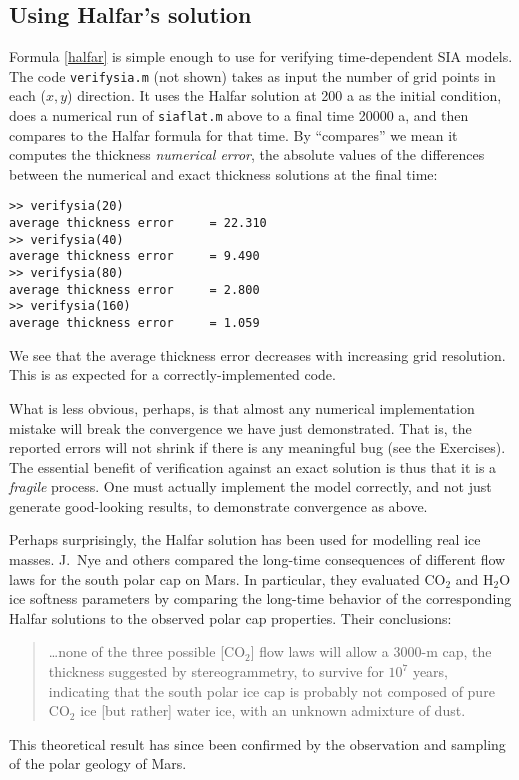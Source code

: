 \documentclass[letterpaper,final,12pt,reqno]{amsart}
\begin{document}
\subsection*{Using Halfar's solution}  Formula \eqref{halfar} is simple enough to use for verifying time-dependent SIA models.  The code \texttt{verifysia.m} (not shown) takes as input the number of grid points in each ($x,y$) direction.  It uses the Halfar solution at 200 a as the initial condition, does a numerical run of \texttt{siaflat.m} above to a final time 20000 a, and then compares to the Halfar formula for that time.  By ``compares'' we mean it computes the thickness \emph{numerical error}, the absolute values of the differences between the numerical and exact thickness solutions at the final time:
\small
\begin{verbatim}
>> verifysia(20)
average thickness error     = 22.310
>> verifysia(40)
average thickness error     = 9.490
>> verifysia(80)
average thickness error     = 2.800
>> verifysia(160)
average thickness error     = 1.059
\end{verbatim}
\normalsize
We see that the average thickness error decreases with increasing grid resolution.  This is as expected for a correctly-implemented code.

What is less obvious, perhaps, is that almost any numerical implementation mistake will break the convergence we have just demonstrated.  That is, the reported errors will not shrink if there is any meaningful bug (see the Exercises).  The essential benefit of verification against an exact solution is thus that it is a \emph{fragile} process.  One must actually implement the model correctly, and not just generate good-looking results, to demonstrate convergence as above.

Perhaps surprisingly, the Halfar solution has been used for modelling real ice masses.  J.~Nye and others \cite{NyeIcarus2000} compared the long-time consequences of different flow laws for the south polar cap on Mars.  In particular, they evaluated $\text{CO}_2$ and $\text{H}_2\text{O}$ ice softness parameters by comparing the long-time behavior of the corresponding Halfar solutions to the observed polar cap properties.  Their conclusions:
  \begin{quote}
  \dots none of the three possible [$\text{CO}_2$] flow laws will allow a 3000-m cap, the thickness suggested by stereogrammetry, to survive for $10^7$ years, indicating that the south polar ice cap is probably not composed of pure $\text{CO}_2$ ice [but rather] water ice, with an unknown admixture of dust.
  \end{quote}
This theoretical result has since been confirmed by the observation and sampling of the polar geology of Mars.
\end{document}
